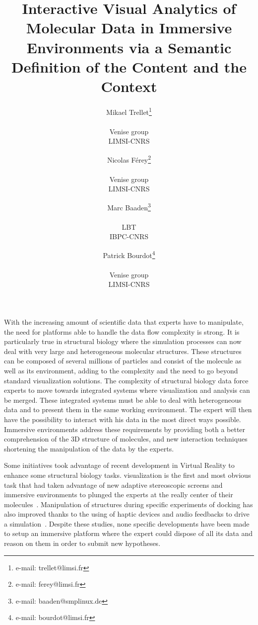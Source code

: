\documentclass{vgtc}                          %
\title{Interactive Visual Analytics of Molecular Data in Immersive Environments via a Semantic Definition of the Content and the Context}
\author{Mikael Trellet\thanks{e-mail: trellet@limsi.fr}\\ %
      \parbox{1.4in}{\scriptsize \centering Venise group \\ LIMSI-CNRS }%
\and Nicolas Férey\thanks{e-mail: ferey@limsi.fr}\\ %
     \parbox{1.4in}{\scriptsize \centering Venise group \\ LIMSI-CNRS }%
\and Marc Baaden\thanks{e-mail: baaden@smplinux.de}\\ %
     \parbox{1.4in}{\scriptsize \centering LBT \\ IBPC-CNRS}
\and Patrick Bourdot\thanks{e-mail: bourdot@limsi.fr}\\ %
     \parbox{1.4in}{\scriptsize \centering Venise group \\ LIMSI-CNRS }}%
\begin{document}


\maketitle



With the increasing amount of scientific data that experts have to manipulate, the need for platforms able to handle the data flow complexity is strong. It is particularly true in structural biology where the simulation processes can now deal with very large and heterogeneous molecular structures. These structures can be composed of several millions of particles and consist of the molecule as well as its environment, adding to the complexity and the need to go beyond standard visualization solutions.
The complexity of structural biology data force experts to move towards integrated systems where visualization and analysis can be merged. These integrated systems must be able to deal with heterogeneous data and to present them in the same working environment. The expert will then have the possibility to interact with his data in the most direct ways possible.
Immersive environments address these requirements by providing both a better comprehension of the 3D structure of molecules, and new interaction techniques shortening the manipulation of the data by the experts.

Some initiatives took advantage of recent development in Virtual Reality to enhance some structural biology tasks. visualization is the first and most obvious task that had taken advantage of new adaptive stereoscopic screens and immersive environments to plunged the experts at the really center of their molecules~\cite{van2000immersive,stone_immersive_2010,odonoghue_visualization_2010,hirst2014molecular}. Manipulation of structures during specific experiments of docking has also improved thanks to the using of haptic devices and audio feedbacks to drive a simulation~\cite{ferey_multisensory_2009}. Despite these studies, none specific developments have been made to setup an immersive platform where the expert could dispose of all its data and reason on them in order to submit new hypotheses.
\end{document}
